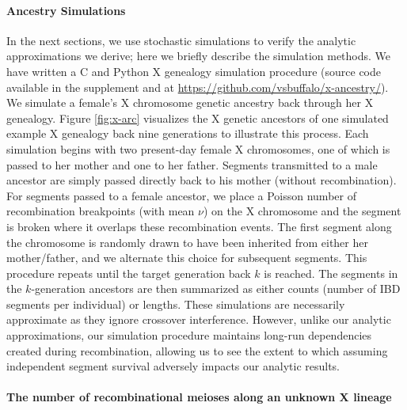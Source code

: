 \documentclass[9pt,twocolumn,twoside]{gsajnl}
\begin{document}
\paragraph{Ancestry Simulations} 

In the next sections, we use stochastic simulations to verify the analytic
approximations we derive; here we briefly describe the simulation methods. We
have written a C and Python X genealogy simulation procedure (source code
available in the supplement and at
\url{https://github.com/vsbuffalo/x-ancestry/}). We simulate a female's X
chromosome genetic ancestry back through her X genealogy. Figure
\ref{fig:x-arc} visualizes the X genetic ancestors of one simulated example X
genealogy back nine generations to illustrate this process. Each simulation
begins with two present-day female X chromosomes, one of which is passed to her
mother and one to her father. Segments transmitted to a male ancestor are
simply passed directly back to his mother (without recombination). For segments
passed to a female ancestor, we place a Poisson number of recombination
breakpoints (with mean $\nu$) on the X chromosome and the segment is broken
where it overlaps these recombination events. The first segment along the
chromosome is randomly drawn to have been inherited from either her
mother/father, and we alternate this choice for subsequent segments. This
procedure repeats until the target generation back $k$ is reached. The segments
in the $k$-generation ancestors are then summarized as either counts (number of
IBD segments per individual) or lengths.  These simulations are necessarily
approximate as they ignore crossover interference.  However, unlike our
analytic approximations, our simulation procedure maintains long-run
dependencies created during recombination, allowing us to see the extent to
which assuming independent segment survival adversely impacts our analytic
results.

\paragraph{The number of recombinational meioses along an unknown X lineage}
\end{document}
